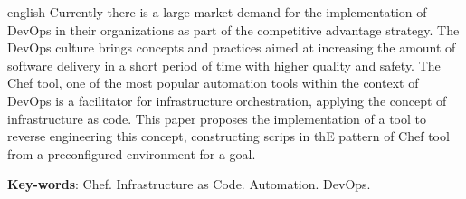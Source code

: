 \newpage\null\thispagestyle{empty}\newpage
\begin{resumo}[Abstract]
  \begin{otherlanguage*}{english}
    Currently there is a large market demand for the implementation
    of DevOps in their organizations as part of the competitive advantage
    strategy. The DevOps culture brings concepts and practices aimed at increasing
    the amount of software delivery in a short period of time with higher quality
    and safety. The Chef tool, one of the most popular automation tools within the
    context of DevOps is a facilitator for infrastructure orchestration, applying
    the concept of infrastructure as code. This paper proposes the implementation
    of a tool to reverse engineering this concept, constructing scrips in thE
    pattern of Chef tool from a preconfigured environment for a goal.

    \vspace{\onelineskip}
    \noindent 
    \textbf{Key-words}: Chef. Infrastructure as Code. Automation. DevOps.
  \end{otherlanguage*}
\end{resumo}
